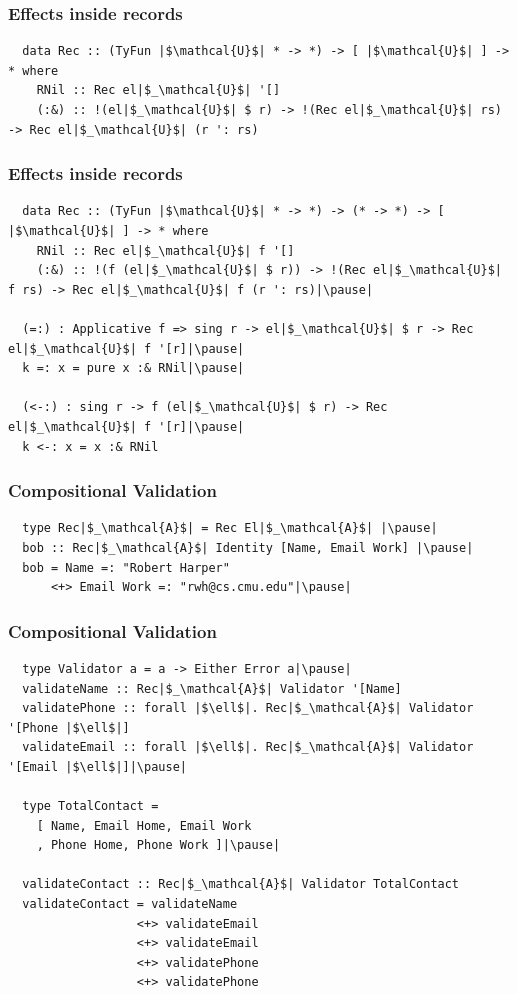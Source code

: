 \documentclass[tikz, 12pt]{beamer}
\begin{document}
\begin{frame}[fragile]
  \frametitle{Effects inside records}
  \begin{lstlisting}
  data Rec :: (TyFun |$\mathcal{U}$| * -> *) -> [ |$\mathcal{U}$| ] -> * where
    RNil :: Rec el|$_\mathcal{U}$| '[]
    (:&) :: !(el|$_\mathcal{U}$| $ r) -> !(Rec el|$_\mathcal{U}$| rs) -> Rec el|$_\mathcal{U}$| (r ': rs)
  \end{lstlisting}
\end{frame}
\begin{frame}[fragile]
  \frametitle{Effects inside records}
  \begin{lstlisting}
  data Rec :: (TyFun |$\mathcal{U}$| * -> *) -> (* -> *) -> [ |$\mathcal{U}$| ] -> * where
    RNil :: Rec el|$_\mathcal{U}$| f '[]
    (:&) :: !(f (el|$_\mathcal{U}$| $ r)) -> !(Rec el|$_\mathcal{U}$| f rs) -> Rec el|$_\mathcal{U}$| f (r ': rs)|\pause|

  (=:) : Applicative f => sing r -> el|$_\mathcal{U}$| $ r -> Rec el|$_\mathcal{U}$| f '[r]|\pause|
  k =: x = pure x :& RNil|\pause|

  (<-:) : sing r -> f (el|$_\mathcal{U}$| $ r) -> Rec el|$_\mathcal{U}$| f '[r]|\pause|
  k <-: x = x :& RNil
  \end{lstlisting}
\end{frame}

\begin{frame}[fragile]
  \frametitle{Compositional Validation}

  \begin{lstlisting}
  type Rec|$_\mathcal{A}$| = Rec El|$_\mathcal{A}$| |\pause|
  bob :: Rec|$_\mathcal{A}$| Identity [Name, Email Work] |\pause|
  bob = Name =: "Robert Harper"
      <+> Email Work =: "rwh@cs.cmu.edu"|\pause|
  \end{lstlisting}
\end{frame}

\begin{frame}[fragile]
  \frametitle{Compositional Validation}
  \begin{lstlisting}
  type Validator a = a -> Either Error a|\pause|
  validateName :: Rec|$_\mathcal{A}$| Validator '[Name]
  validatePhone :: forall |$\ell$|. Rec|$_\mathcal{A}$| Validator '[Phone |$\ell$|]
  validateEmail :: forall |$\ell$|. Rec|$_\mathcal{A}$| Validator '[Email |$\ell$|]|\pause|

  type TotalContact =
    [ Name, Email Home, Email Work
    , Phone Home, Phone Work ]|\pause|

  validateContact :: Rec|$_\mathcal{A}$| Validator TotalContact
  validateContact = validateName
                  <+> validateEmail
                  <+> validateEmail
                  <+> validatePhone
                  <+> validatePhone
  \end{lstlisting}
\end{frame}
\end{document}
